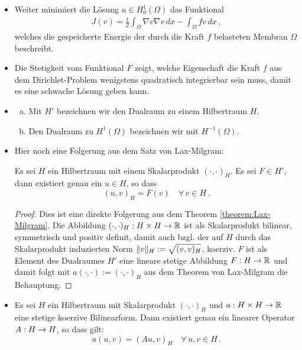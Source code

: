 \begin{itemize}
\item Weiter minimiert die Lösung $u \in H^1_0(\Omega)$ das Funktional
\begin{align*}
	J(v) = \frac 12 \int_\Omega \nabla v\nabla v \, dx - \int_\Omega fv \, dx \, ,
\end{align*}
welches die gespeicherte Energie der durch die Kraft $f$ belasteten Membran $\Omega$ beschreibt.

\item \begin{bem*}
Die Stetigkeit vom Funktional $F$ zeigt, welche Eigenschaft die Kraft $f$ aus dem Dirichlet-Problem wenigstens quadratisch integrierbar sein muss, damit es eine schwache Lösung geben kann.
\end{bem*}

\item \begin{bem*}
\begin{enumerate}[(a)]
\item Mit $H'$ bezeichnen wir den Dualraum zu einem Hilbertraum $H$.
\item Den Dualraum zu $H^1(\Omega)$ bezeichnen wir mit $H^{-1}(\Omega)$.
\end{enumerate}
\end{bem*}
\item Hier noch eine Folgerung aus dem Satz von Lax-Milgram:
\begin{satz}\label{satz:2.14}
Es sei $H$ ein Hilbertraum mit einem Skalarprodukt $(\cdot,\cdot)_H$. Es sei $F \in H'$, dann existiert genau ein $u \in H$, so dass
\[
	(u,v)_H = F(v) \quad \forall \, v \in H \, .
\]
\end{satz}

\begin{proof}
Dies ist eine direkte Folgerung aus dem Theorem \ref{theorem:Lax-Milgram}. Die Abbildung $(\cdot,\cdot)_H:H\times H \rightarrow \mathbb{R}$ ist als Skalarprodukt bilinear, symmetrisch und positiv definit, damit auch bzgl. der auf $H$ durch das Skalarprodukt induzierten Norm $\lVert v\rVert_H := \sqrt{(v,v)_H}$, koerziv. $F$ ist als Element des Dualraumes $H'$ eine lineare stetige Abbildung $F:H\rightarrow\mathbb{R}$ und damit folgt mit $a(\cdot,\cdot) :=(\cdot,\cdot)_H$ aus dem Theorem von Lax-Milgram die Behauptung.
\end{proof}

\item \begin{kor}\label{kor:2.14}
Es sei $H$ ein Hilbertraum mit Skalarprodukt $(\cdot,\cdot)_H$ und $a:H\times H\rightarrow \mathbb{R}$ eine stetige koerzive Bilinearform. Dann existiert genau ein linearer Operator $A : H \rightarrow H$, so dass gilt:
\[
	a(u,v)  = (Au,v)_H \quad \forall \, u , v \in H \, .
\]
\end{kor}


\end{itemize}
